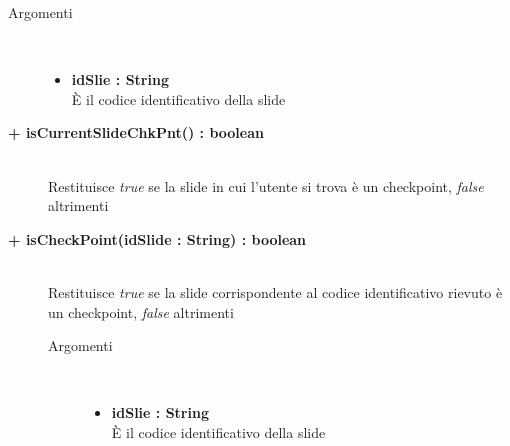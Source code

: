 \begin{description}
\begin{description}
		\begin{description}
			\item[Argomenti] \hfill \\
				\begin{itemize}
				
					\item \textbf{idSlie : String	} \hfill \\
					È il codice identificativo della slide
					
				\end{itemize}
			
		\end{description}
	\end{description}
	
	\begin{description}
		\item[\textbf{\color{blue}+ isCurrentSlideChkPnt() : boolean			}] \hfill \\
			Restituisce \textit{true} se la slide in cui l'utente si trova è un checkpoint, \textit{false} altrimenti
			
	\end{description}
	
	\begin{description}
		\item[\textbf{\color{blue}+ isCheckPoint(idSlide : String) : boolean			}] \hfill \\
			Restituisce \textit{true} se la slide corrispondente al codice identificativo rievuto è un checkpoint, \textit{false} altrimenti
			
		\begin{description}
			\item[Argomenti] \hfill \\
				\begin{itemize}
				
					\item \textbf{idSlie : String	} \hfill \\
					È il codice identificativo della slide
					
				\end{itemize}
			
		\end{description}
			
	\end{description}
	

\end{description}
